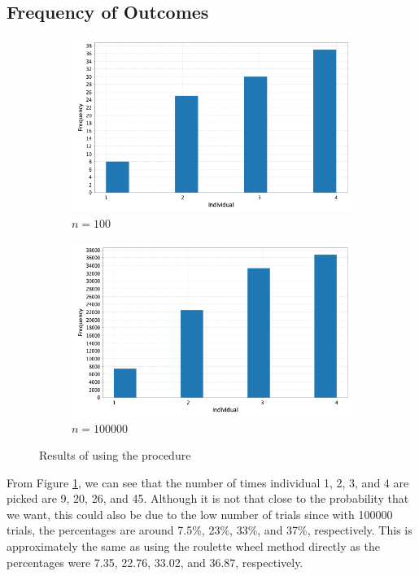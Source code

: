 \subsection{Frequency of Outcomes}

\begin{figure}[ht]
    \centering
    \begin{subfigure}{0.45\textwidth}
        \includegraphics[width=\textwidth]{../images/p1/roulette_histogram.png}
        \caption{\(n=100\)}
    \end{subfigure}
    \begin{subfigure}{0.45\textwidth}
        \includegraphics[width=\textwidth]{../images/p1/roulette_histogram2.png}
        \caption{\(n=100000\)}
    \end{subfigure}
    \caption{Results of using the procedure}
    \label{fig:roulette-outcome}
\end{figure}

From Figure \ref{fig:roulette-outcome}, we can see that the number of times individual 1, 2, 3, and 4 are picked are 9, 20, 26, and 45. Although it is not that close to the probability that we want, this could also be due to the low number of trials since with 100000 trials, the percentages are around 7.5\%, 23\%, 33\%, and 37\%, respectively. This is approximately the same as using the roulette wheel method directly as the percentages were 7.35, 22.76, 33.02, and 36.87, respectively.
